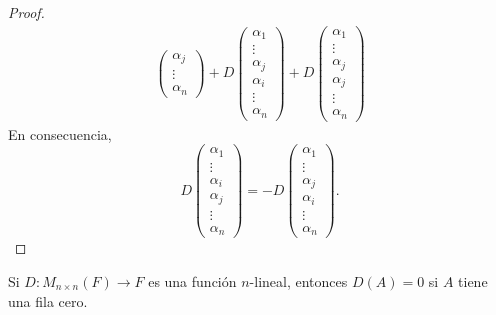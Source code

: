 \documentclass[12pt,a4paper]{book}
\begin{document}
\begin{proof}
\begin{align*}
\begin{pmatrix}
                \alpha_{j}\\
                \vdots\\
                \alpha_{n}
            \end{pmatrix} + D
            \begin{pmatrix}
                \alpha_{1}\\
                \vdots\\
                \alpha_{j}\\
                \alpha_{i}\\
                \vdots\\
                \alpha_{n}
            \end{pmatrix} + D
            \begin{pmatrix}
                \alpha_{1}\\
                \vdots\\
                \alpha_{j}\\
                \alpha_{j}\\
                \vdots\\
                \alpha_{n}
            \end{pmatrix}
        \end{align*}
        En consecuencia,
        \begin{equation*}
            D\begin{pmatrix}
            \alpha_{1}\\
            \vdots\\
            \alpha_{i}\\
            \alpha_{j}\\
            \vdots\\
            \alpha_{n}
        \end{pmatrix} = -D
        \begin{pmatrix}
            \alpha_{1}\\
            \vdots\\
            \alpha_{j}\\
            \alpha_{i}\\
            \vdots\\
            \alpha_{n}
        \end{pmatrix}.
        \end{equation*}
    \end{proof}

    \begin{lema}
    \label{lema:7}
        Si $D:M_{n \times n}(F) \to F$ es una función $n$-lineal, entonces $D(A) = 0$ si $A$ tiene una fila cero.
    \end{lema}
    
\end{document}
